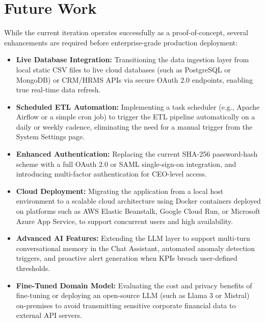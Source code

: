 \documentclass{book}
\begin{document}
\section{Future Work}
While the current iteration operates successfully as a proof-of-concept, several enhancements are required before enterprise-grade production deployment:
\begin{itemize}
    \item \textbf{Live Database Integration:} Transitioning the data ingestion layer from local static CSV files to live cloud databases (such as PostgreSQL or MongoDB) or CRM/HRMS APIs via secure OAuth 2.0 endpoints, enabling true real-time data refresh.
    \item \textbf{Scheduled ETL Automation:} Implementing a task scheduler (e.g., Apache Airflow or a simple cron job) to trigger the ETL pipeline automatically on a daily or weekly cadence, eliminating the need for a manual trigger from the System Settings page.
    \item \textbf{Enhanced Authentication:} Replacing the current SHA-256 password-hash scheme with a full OAuth 2.0 or SAML single-sign-on integration, and introducing multi-factor authentication for CEO-level access.
    \item \textbf{Cloud Deployment:} Migrating the application from a local host environment to a scalable cloud architecture using Docker containers deployed on platforms such as AWS Elastic Beanstalk, Google Cloud Run, or Microsoft Azure App Service, to support concurrent users and high availability.
    \item \textbf{Advanced AI Features:} Extending the LLM layer to support multi-turn conversational memory in the Chat Assistant, automated anomaly detection triggers, and proactive alert generation when KPIs breach user-defined thresholds.
    \item \textbf{Fine-Tuned Domain Model:} Evaluating the cost and privacy benefits of fine-tuning or deploying an open-source LLM (such as Llama 3 or Mistral) on-premises to avoid transmitting sensitive corporate financial data to external API servers.
\end{itemize}
\end{document}
